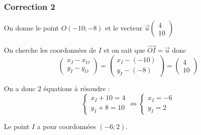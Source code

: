 \documentclass[15pt, mathserif]{beamer}
\begin{document}
\begin{frame}
\vspace{-10mm}
	\frametitle{Correction 2}
\vspace*{0.5cm} 
 On donne le point $O(-10;-8)$ et le vecteur $\vec{u}\begin{pmatrix} 4\\ 10 \end{pmatrix}$ 
 
 On cherche les coordonnées de $I$ et on sait que $\vec{OI}=\vec{u}$ donc $$\begin{pmatrix} x_{I}-x_O \\ y_{I}-y_O \end{pmatrix}=\begin{pmatrix} x_{I}-\left(-10\right) \\ y_{I}-\left(-8\right)\end{pmatrix}=\begin{pmatrix} 4 \\ 10 \end{pmatrix}$$ 
 
 On a donc 2 équations à résoudre :  
 $$ \left\{ \begin{array}{cc} 
  x_{I}+10=4 \\ 
  y_{I}+8=10 
 \end{array} \right. \Leftrightarrow \left\{ \begin{array}{cc} 
  x_{I}=-6 \\ 
 y_{I}=2 
 \end{array} \right. $$ 
 
 Le point $I$ a pour coordonnées $(-6;2)$.\end{frame}
\end{document}
